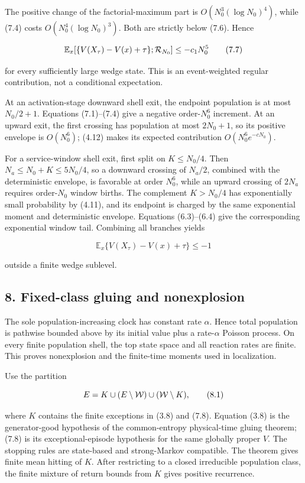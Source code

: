 The positive change of the factorial-maximum part is
\(O(N_0^3(\log N_0)^4)\), while (7.4) costs \(O(N_0^4(\log N_0)^3)\).
Both are strictly below (7.6). Hence

\[
 \mathbb E_x[\{V(X_\tau)-V(x)+\tau\};{\cal R}_{N_0}]
 \le-c_1N_0^5                                         \tag{7.7}
\]

for every sufficiently large wedge state. This is an event-weighted
regular contribution, not a conditional expectation.

At an activation-stage downward shell exit, the endpoint population is
at most \(N_0/2+1\). Equations (7.1)--(7.4) give a negative
order-\(N_0^6\) increment. At an upward exit, the first crossing has
population at most \(2N_0+1\), so its positive envelope is \(O(N_0^6)\);
(4.12) makes its expected contribution \(O(N_0^6e^{-cN_0})\).

For a service-window shell exit, first split on \(K\le N_0/4\). Then
\(N_a\le N_0+K\le5N_0/4\), so a downward crossing of \(N_a/2\), combined
with the deterministic envelope, is favorable at order \(N_0^6\), while
an upward crossing of \(2N_a\) requires order-\(N_0\) window births. The
complement \(K>N_0/4\) has exponentially small probability by (4.11),
and its endpoint is charged by the same exponential moment and
deterministic envelope. Equations (6.3)--(6.4) give the corresponding
exponential window tail. Combining all branches yields

\[
                         \mathbb E_x\{V(X_\tau)-V(x)+\tau\}\le-1        \tag{7.8}
\]

outside a finite wedge sublevel.

\subsection{8. Fixed-class gluing and
nonexplosion}

The sole population-increasing clock has constant rate \(\alpha\). Hence
total population is pathwise bounded above by its initial value plus a
rate-\(\alpha\) Poisson process. On every finite population shell, the
top state space and all reaction rates are finite. This proves
nonexplosion and the finite-time moments used in localization.

Use the partition

\[
 E=K\cup(E\setminus{\cal W})\cup({\cal W}\setminus K), \tag{8.1}
\]

where \(K\) contains the finite exceptions in (3.8) and (7.8). Equation
(3.8) is the generator-good hypothesis of the common-entropy
physical-time gluing theorem; (7.8) is its exceptional-episode
hypothesis for the same globally proper \(V\). The stopping rules are
state-based and strong-Markov compatible. The theorem gives finite mean
hitting of \(K\). After restricting to a closed irreducible population
class, the finite mixture of return bounds from \(K\) gives positive
recurrence.

